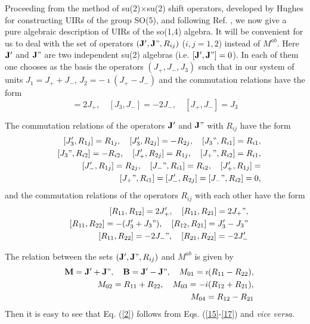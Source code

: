 \documentclass[a4paper,12pt]{article}%
\begin{document}
Proceeding from the method of su(2)$\times$su(2) shift
operators, developed by Hughes \cite{Hug} for constructing
UIRs of the group SO(5), and following Ref. \cite{lev3},
we now give a pure algebraic description of UIRs of
the so(1,4) algebra. It will be convenient for us to  deal
with the set of operators $({\bf J}',{\bf J}",R_{ij})$ ($i,j=1,2$)
instead  of $M^{ab}$.
Here ${\bf J}'$ and ${\bf J}"$ are two independent su(2) algebras
(i.e. $[{\bf J}',{\bf J}"]=0$).
In each of them one chooses as the basis the operators  
$(J_+,J_-,J_3)$ such that in our system of units 
$J_1=J_++J_-$, $J_2=-\imath (J_+-J_-)$ and the commutation
relations have the form
\begin{equation}
[J_3,J_+]=2J_+,\quad [J_3,J_-]=-2J_-,\quad [J_+,J_-]=J_3
\label{14}
\end{equation}

The commutation relations of the operators ${\bf J}'$ and
${\bf J}"$  with $R_{ij}$ have the form
\begin{eqnarray}
&&[J_3',R_{1j}]=R_{1j},\quad [J_3',R_{2j}]=-R_{2j},\quad
[J_3",R_{i1}]=R_{i1},\nonumber\\
&& [J_3",R_{i2}]=-R_{i2},\quad
[J_+',R_{2j}]=R_{1j},\quad [J_+",R_{i2}]=R_{i1},\nonumber\\
&&[J_-',R_{1j}]=R_{2j},\quad [J_-",R_{i1}]=R_{i2},\quad
[J_+',R_{1j}]=\nonumber\\
&&[J_+",R_{i1}]=[J_-',R_{2j}]=[J_-",R_{i2}]=0,\nonumber\\
\label{15}
\end{eqnarray}
and the commutation relations of the operators $R_{ij}$ 
with each other have the form
\begin{eqnarray}
&&[R_{11},R_{12}]=2J_+',\quad 
[R_{11},R_{21}]=2J_+",\nonumber\\
&& [R_{11},R_{22}]=-(J_3'+J_3"),\quad 
[R_{12},R_{21}]=J_3'-J_3"\nonumber\\
&& [R_{11},R_{22}]=-2J_-",\quad [R_{21},R_{22}]=-2J_-'
\label{16}
\end{eqnarray}

The relation between the sets $({\bf J}',{\bf J}",R_{ij})$ and
$M^{ab}$  is given by
\begin{eqnarray}
&&{\bf M}={\bf J}'+{\bf J}", \quad {\bf B}={\bf J}'-{\bf J}",
\quad M_{01}=\imath (R_{11}-R_{22}), \nonumber\\
&& M_{02}=R_{11}+R_{22}, \quad  
M_{03}=-i(R_{12}+R_{21}),\nonumber\\
&&  M_{04}=R_{12}-R_{21}
\label{17}
\end{eqnarray}
Then it is easy to see that Eq. (\ref{2}) 
follows from Eqs. (\ref{15}-\ref{17}) and {\it vice versa}.
\end{document}
